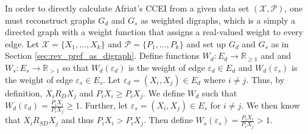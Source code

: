 \documentclass{article} %
\theoremstyle{style1}
\theoremstyle{style1}
\theoremstyle{example}
\begin{document}
In order to directly calculate Afriat's CCEI from a given data set $(\mathcal{X},\mathcal{P})$, one must reconstruct graphs $G_d$ and $G_s$ as weighted digraphs, which is a simply a directed graph with a weight function that assigns a real-valued weight to every edge. Let $\mathcal{X}=\{X_1,\ldots,X_k\}$ and $\mathcal{P}=\{P_1,\ldots,P_k\}$ and set up $G_d$ and $G_s$ as in Section \ref{sec:rev_pref_as_digraph}. Define functions $W_d:E_d\to\mathbb{R}_{\geq1}$ and and $W_s:E_s \to\mathbb{R}_{>1}$ so that $W_d(\varepsilon_d)$ is the weight of edge $\varepsilon_d\in E_d$ and $W_d(\varepsilon_s)$ is the weight of edge $\varepsilon_s\in E_s$. Let $\varepsilon_d =(X_i, X_j)\in E_d$ where $i\not=j$. Thus, by definition, $X_i R_D X_j$ and $P_iX_i\geq P_iX_j$. We define $W_d$ such that $W_d(\varepsilon_d)=\frac{P_iX_i}{P_iX_j}\geq 1$. Further, let $\varepsilon_s=(X_i, X_j)\in E_s$ for $i\not=j$. We then know that $X_i R_{SD} X_j$ and thus $P_iX_i>P_iX_j$. Then define $W_s(\varepsilon_s)=\frac{P_iX_i}{P_iX_j}>1$.
\end{document}
